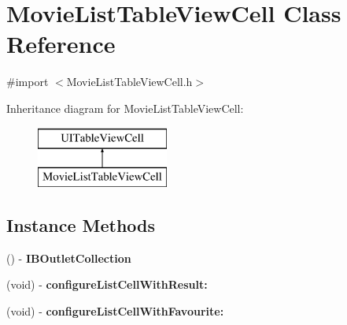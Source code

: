 \section{Movie\+List\+Table\+View\+Cell Class Reference}
\label{interface_movie_list_table_view_cell}


{\ttfamily \#import $<$Movie\+List\+Table\+View\+Cell.\+h$>$}

Inheritance diagram for Movie\+List\+Table\+View\+Cell\+:\begin{figure}[H]
\begin{center}
\leavevmode
\includegraphics[height=2.000000cm]{interface_movie_list_table_view_cell}
\end{center}
\end{figure}
\subsection*{Instance Methods}
\begin{DoxyCompactItemize}
\item 
() -\/ {\bfseries I\+B\+Outlet\+Collection}\label{interface_movie_list_table_view_cell_a9f256300832d40c99cdeb55af273e533}

\item 
(void) -\/ {\bf configure\+List\+Cell\+With\+Result\+:}
\item 
(void) -\/ {\bf configure\+List\+Cell\+With\+Favourite\+:}
\end{DoxyCompactItemize}
